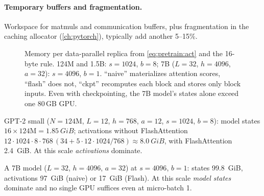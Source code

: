 \paragraph{Temporary buffers and fragmentation.} Workspace for matmuls and communication
buffers, plus fragmentation in the caching allocator (\cref{ch:pytorch}), typically add
another 5--15\%.

\begin{figure}[t]
\centering
{}
\caption{Memory per data-parallel replica from \cref{eq:pretrain:act} and the 16-byte rule.
124M and 1.5B: $s=1024$, $b=8$; 7B ($L{=}32$, $h{=}4096$, $a{=}32$): $s=4096$, $b=1$.
``naive'' materializes attention scores, ``flash'' does not, ``ckpt'' recomputes each block
and stores only block inputs. Even with checkpointing, the 7B model's states alone exceed one
80\,GB GPU.}
\label{fig:pretrain:membar}
\end{figure}

\begin{napkinmath}
GPT-2 small ($N=124$M, $L=12$, $h=768$, $a=12$, $s=1024$, $b=8$): model states
$16\times124\text{M}=\SI{1.85}{GiB}$; activations without FlashAttention
$12\cdot 1024\cdot 8\cdot 768\,(34+5\cdot12\cdot1024/768)\approx\SI{8.0}{GiB}$, with FlashAttention
\SI{2.4}{GiB}. At this scale \emph{activations} dominate.

A 7B model ($L=32$, $h=4096$, $a=32$) at $s=4096$, $b=1$: states \SI{99.8}{GiB},
activations \SI{97}{GiB} (naive) or \SI{17}{GiB} (Flash). At this scale \emph{model states}
dominate and no single GPU suffices even at micro-batch 1.
\end{napkinmath}

